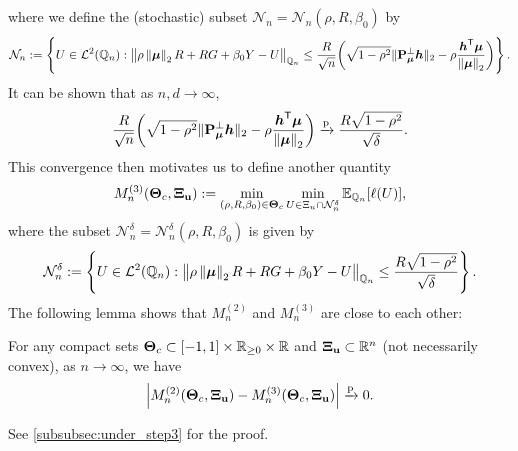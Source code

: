 where we define the (stochastic) subset $\mathcal{N}_n = \mathcal{N}_n(\rho, R, \beta_0)$ by
\begin{equation}
\label{eq:set_N_n}
    \mathcal{N}_n := \left\{
        U \in \mathcal{L}^2(\mathbb{Q}_n): 
        \bigl\| \rho\left\|{{\boldsymbol{\mu}}}\right\|_2 R + R G + \beta_0 Y - U \bigr\|_{\mathbb{Q}_n}
        \le \frac{R}{\sqrt{n}} \biggl( \sqrt{1 - \rho^2}  \| \mathrm{\bf P}_{\text{\boldmath $\mu$}}^\perp \text{\boldmath $h$} \|_2  -  \rho\frac{\text{\boldmath $h$}^{\sf T} {\boldsymbol{\mu}}}{\left\|{{\boldsymbol{\mu}}}\right\|_2}  \biggr)
     \right\}.
\end{equation}
It can be shown that as $n, d \to \infty$,
\begin{equation*}
    \frac{R}{\sqrt{n}} \biggl( \sqrt{1 - \rho^2}  \| \mathrm{\bf P}_{\text{\boldmath $\mu$}}^\perp \text{\boldmath $h$} \|_2  -  \rho\frac{\text{\boldmath $h$}^{\sf T} {\boldsymbol{\mu}}}{\left\|{{\boldsymbol{\mu}}}\right\|_2}  \biggr)
    \xrightarrow{\mathrm{p}} \frac{R \sqrt{1 - \rho^2}}{\sqrt{\delta}}.
\end{equation*}
This convergence then motivates us to define another quantity
\begin{equation}
    \label{eq:Mn(3)}
        M_n^{(3)}(\text{\boldmath $\Theta$}_{c}, \text{\boldmath $\Xi$}_{\mathrm{\bf u}}) 
        :=  
        \min_{ (\rho, R, \beta_0) \in \text{\boldmath $\Theta$}_{c} } 
        \min_{ U \in \Xi_{u}  \cap   \mathcal{N}^\delta_n }
        \mathbb{E}_{\mathbb{Q}_n}[\ell(U)],
\end{equation}
where the subset $\mathcal{N}^\delta_n = \mathcal{N}^\delta_n(\rho, R, \beta_0)$ is given by
\begin{equation}
\label{eq:set_N_n_delta}
    \mathcal{N}_n^\delta := \left\{
        U \in \mathcal{L}^2(\mathbb{Q}_n): 
        \bigl\| \rho\left\|{{\boldsymbol{\mu}}}\right\|_2 R + R G + \beta_0 Y - U \bigr\|_{\mathbb{Q}_n}
        \le \frac{R \sqrt{1 - \rho^2}}{\sqrt{\delta}}
     \right\}.
\end{equation}
The following lemma shows that $M_n^{(2)}$ and $M_n^{(3)}$ are close to each other:
\begin{lem}\label{lem:M2-3}
    For any compact sets $\text{\boldmath $\Theta$}_{c} \subset [-1, 1] \times \mathbb{R}_{\ge 0} \times \mathbb{R}$ and $\text{\boldmath $\Xi$}_{\mathrm{\bf u}} \subset \mathbb{R}^{n}$ (not necessarily convex), as $n \to \infty$, we have
    \begin{equation*}
        \left|{ M_n^{(2)}(\text{\boldmath $\Theta$}_{c}, \text{\boldmath $\Xi$}_{\mathrm{\bf u}}) - M_n^{(3)}(\text{\boldmath $\Theta$}_{c}, \text{\boldmath $\Xi$}_{\mathrm{\bf u}}) }\right| \xrightarrow{\mathrm{p}} 0.
    \end{equation*}
\end{lem}
\noindent
See \cref{subsubsec:under_step3} for the proof.




